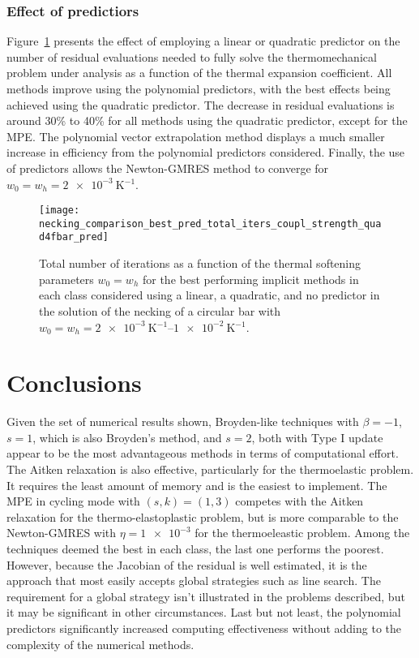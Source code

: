 \subsubsection{Effect of predictiors}

Figure~\ref{fig:necking_comparison_best_pred_total_iters_coupl_strength_quad4fbar_pred} presents the effect of employing a linear or quadratic predictor on the number of residual evaluations needed to fully solve the thermomechanical problem under analysis as a function of the thermal expansion coefficient.
All methods improve using the polynomial predictors, with the best effects being achieved using the quadratic predictor.
The decrease in residual evaluations is around 30\% to 40\% for all methods using the quadratic predictor, except for the MPE.
The polynomial vector extrapolation method displays a much smaller increase in efficiency from the polynomial predictors considered.
Finally, the use of predictors allows the Newton-GMRES method to converge for \(w_0=w_h=\SI{2e-3}{\kelvin^{-1}}\).

\begin{figure}[hbtp]
 \texttt{[image: necking\_comparison\_best\_pred\_total\_iters\_coupl\_strength\_quad4fbar\_pred]}
 \caption{Total number of iterations as a function of the thermal softening parameters \(w_0=w_h\) for the best performing implicit methods in each class considered using a linear, a quadratic, and no predictor in the solution of the necking of a circular bar with \(w_0=w_h=\SIrange{2e-3}{1e-2}{\kelvin^{-1}}\).}
\label{fig:necking_comparison_best_pred_total_iters_coupl_strength_quad4fbar_pred}
\end{figure}


\section{Conclusions}

Given the set of numerical results shown, Broyden-like techniques with \(\beta=-1\), \(s=1\), which is also Broyden's method, and \(s=2\), both with Type I update appear to be the most advantageous methods in terms of computational effort.
The Aitken relaxation is also effective, particularly for the thermoelastic problem.
It requires the least amount of memory and is the easiest to implement.
The MPE in cycling mode with \((s,k)=(1,3)\) competes with the Aitken relaxation for the thermo-elastoplastic problem, but is more comparable to the Newton-GMRES with \(\eta=\num{1e-3}\) for the thermoeleastic problem.
Among the techniques deemed the best in each class, the last one performs the poorest.
However, because the Jacobian of the residual is well estimated, it is the approach that most easily accepts global strategies such as line search.
The requirement for a global strategy isn't illustrated in the problems described, but it may be significant in other circumstances.
Last but not least, the polynomial predictors significantly increased computing effectiveness without adding to the complexity of the numerical methods.

\FloatBarrier
